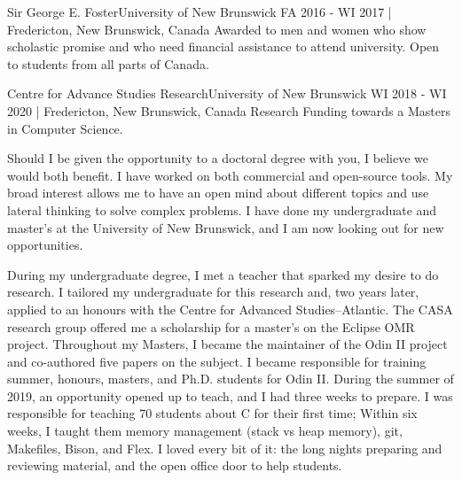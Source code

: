 \documentclass[english,letterpaper,12pt]{deedy-resume-openfont}
\begin{document}


    \employement%
        {Sir George E. Foster}{University of New Brunswick}
        {FA 2016 - WI 2017  | Fredericton, New Brunswick, Canada}{%
        Awarded to men and women who show scholastic promise and who need financial assistance to attend university. 
        Open to students from all parts of Canada.
        }

    \employement%
        {Centre for Advance Studies Research}{University of New Brunswick}
        {WI 2018 - WI 2020   | Fredericton, New Brunswick, Canada}{%
        Research Funding towards a Masters in Computer Science.
        }








\clearpage

\doublespacing


Should I be given the opportunity to a doctoral degree with you, I believe we would both benefit.
I have worked on both commercial and open-source tools.
My broad interest allows me to have an open mind about different topics and use lateral thinking to solve complex problems.
I have done my undergraduate and master's at the University of New Brunswick, and I am now looking out for new opportunities.

During my undergraduate degree, I met a teacher that sparked my desire to do research.
I tailored my undergraduate for this research and, two years later, applied to an honours with the Centre for Advanced Studies--Atlantic. 
The CASA research group offered me a scholarship for a master's on the Eclipse OMR project.
Throughout my Masters, I became the maintainer of the Odin II project and co-authored five papers on the subject.
I became responsible for training summer, honours, masters, and Ph.D. students for Odin II.
During the summer of 2019, an opportunity opened up to teach, and I had three weeks to prepare.
I was responsible for teaching 70 students about C for their first time; 
Within six weeks, I taught them memory management (stack vs heap memory), git, Makefiles, Bison, and Flex.
I loved every bit of it: the long nights preparing and reviewing material, and the open office door to help students.
\end{document}
